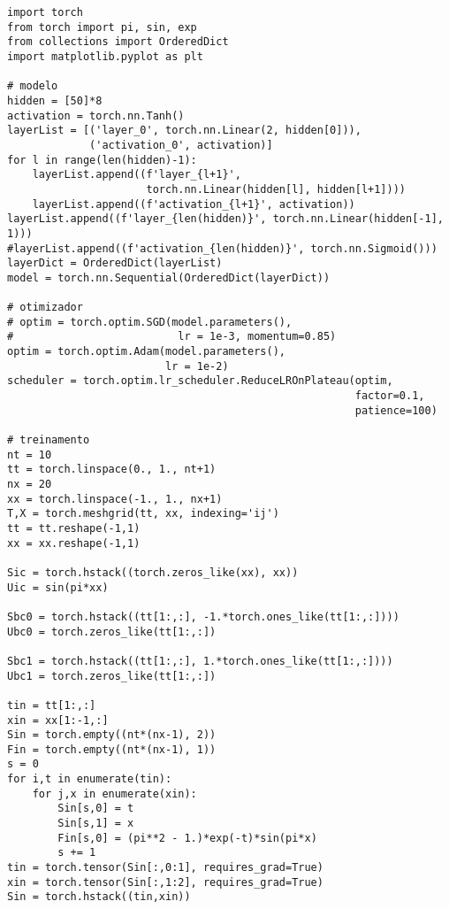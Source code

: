     


\begin{lstlisting}[caption=mlp\_calor\_autograd.py]
import torch
from torch import pi, sin, exp
from collections import OrderedDict
import matplotlib.pyplot as plt

# modelo
hidden = [50]*8
activation = torch.nn.Tanh()
layerList = [('layer_0', torch.nn.Linear(2, hidden[0])),
             ('activation_0', activation)]
for l in range(len(hidden)-1):
    layerList.append((f'layer_{l+1}',
                      torch.nn.Linear(hidden[l], hidden[l+1])))
    layerList.append((f'activation_{l+1}', activation))
layerList.append((f'layer_{len(hidden)}', torch.nn.Linear(hidden[-1], 1)))
#layerList.append((f'activation_{len(hidden)}', torch.nn.Sigmoid()))
layerDict = OrderedDict(layerList)
model = torch.nn.Sequential(OrderedDict(layerDict))

# otimizador
# optim = torch.optim.SGD(model.parameters(),
#                          lr = 1e-3, momentum=0.85)
optim = torch.optim.Adam(model.parameters(),
                         lr = 1e-2)
scheduler = torch.optim.lr_scheduler.ReduceLROnPlateau(optim,
                                                       factor=0.1,
                                                       patience=100)

# treinamento
nt = 10
tt = torch.linspace(0., 1., nt+1)
nx = 20
xx = torch.linspace(-1., 1., nx+1)
T,X = torch.meshgrid(tt, xx, indexing='ij')
tt = tt.reshape(-1,1)
xx = xx.reshape(-1,1)

Sic = torch.hstack((torch.zeros_like(xx), xx))
Uic = sin(pi*xx)

Sbc0 = torch.hstack((tt[1:,:], -1.*torch.ones_like(tt[1:,:])))
Ubc0 = torch.zeros_like(tt[1:,:])

Sbc1 = torch.hstack((tt[1:,:], 1.*torch.ones_like(tt[1:,:])))
Ubc1 = torch.zeros_like(tt[1:,:])

tin = tt[1:,:]
xin = xx[1:-1,:]
Sin = torch.empty((nt*(nx-1), 2))
Fin = torch.empty((nt*(nx-1), 1))
s = 0
for i,t in enumerate(tin):
    for j,x in enumerate(xin):
        Sin[s,0] = t
        Sin[s,1] = x
        Fin[s,0] = (pi**2 - 1.)*exp(-t)*sin(pi*x)
        s += 1
tin = torch.tensor(Sin[:,0:1], requires_grad=True)
xin = torch.tensor(Sin[:,1:2], requires_grad=True)
Sin = torch.hstack((tin,xin))


\end{lstlisting}

